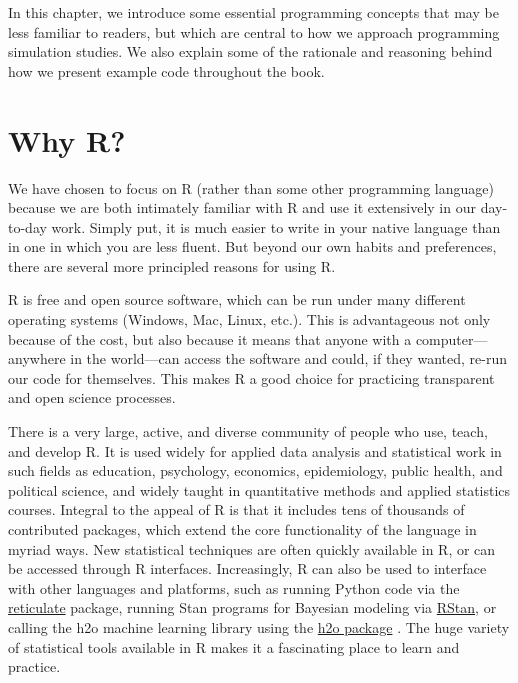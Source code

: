 \documentclass[
]{book}
\begin{document}
In this chapter, we introduce some essential programming concepts that may be less familiar to readers, but which are central to how we approach programming simulation studies.
We also explain some of the rationale and reasoning behind how we present example code throughout the book.

\section{Why R?}\label{why-r}

We have chosen to focus on R (rather than some other programming language) because we are both intimately familiar with R and use it extensively in our day-to-day work.
Simply put, it is much easier to write in your native language than in one in which you are less fluent.
But beyond our own habits and preferences, there are several more principled reasons for using R.

R is free and open source software, which can be run under many different operating systems (Windows, Mac, Linux, etc.).
This is advantageous not only because of the cost, but also because it means that anyone with a computer---anywhere in the world---can access the software and could, if they wanted, re-run our code for themselves.
This makes R a good choice for practicing transparent and open science processes.

There is a very large, active, and diverse community of people who use, teach, and develop R.
It is used widely for applied data analysis and statistical work in such fields as education, psychology, economics, epidemiology, public health, and political science,
and widely taught in quantitative methods and applied statistics courses.
Integral to the appeal of R is that it includes tens of thousands of contributed packages, which extend the core functionality of the language in myriad ways.
New statistical techniques are often quickly available in R, or can be accessed through R interfaces.
Increasingly, R can also be used to interface with other languages and platforms, such as running Python code via the \href{https://rstudio.github.io/reticulate/}{reticulate} package, running Stan programs for Bayesian modeling via \href{https://mc-stan.org/users/interfaces/rstan}{RStan}, or calling the h2o machine learning library using the \href{https://cran.r-project.org/package=h2o}{h2o package} \citep{fryda2014H2oInterfaceH2O}.
The huge variety of statistical tools available in R makes it a fascinating place to learn and practice.
\end{document}
